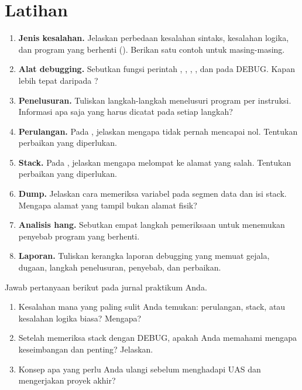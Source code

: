 \section{Latihan}
\label{sec:latihan-bab16}

\begin{enumerate}
    \item \textbf{Jenis kesalahan.} Jelaskan perbedaan kesalahan
          sintaks, kesalahan logika, dan program yang berhenti
          (). Berikan satu contoh untuk masing-masing.

    \item \textbf{Alat debugging.} Sebutkan fungsi perintah
          , , , , dan  pada
          DEBUG. Kapan  lebih tepat daripada ?

    \item \textbf{Penelusuran.} Tuliskan langkah-langkah menelusuri
          program per instruksi. Informasi apa saja yang harus
          dicatat pada setiap langkah?

    \item \textbf{Perulangan.} Pada , jelaskan
          mengapa  tidak pernah mencapai nol. Tentukan
          perbaikan yang diperlukan.

    \item \textbf{Stack.} Pada , jelaskan mengapa
           melompat ke alamat yang salah. Tentukan
          perbaikan yang diperlukan.

    \item \textbf{Dump.} Jelaskan cara memeriksa variabel pada
          segmen data dan isi stack. Mengapa alamat yang tampil
          bukan alamat fisik?

    \item \textbf{Analisis hang.} Sebutkan empat langkah pemeriksaan
          untuk menemukan penyebab program yang berhenti.

    \item \textbf{Laporan.} Tuliskan kerangka laporan debugging yang
          memuat gejala, dugaan, langkah penelusuran, penyebab, dan
          perbaikan.
\end{enumerate}

\begin{refleksibox}
\vspace{1.1em}
Jawab pertanyaan berikut pada jurnal praktikum Anda.
\begin{enumerate}
    \item Kesalahan mana yang paling sulit Anda temukan: perulangan,
          stack, atau kesalahan logika biasa? Mengapa?
    \item Setelah memeriksa stack dengan DEBUG, apakah Anda memahami
          mengapa keseimbangan  dan  penting?
          Jelaskan.
    \item Konsep apa yang perlu Anda ulangi sebelum menghadapi UAS
          dan mengerjakan proyek akhir?
\end{enumerate}
\end{refleksibox}
